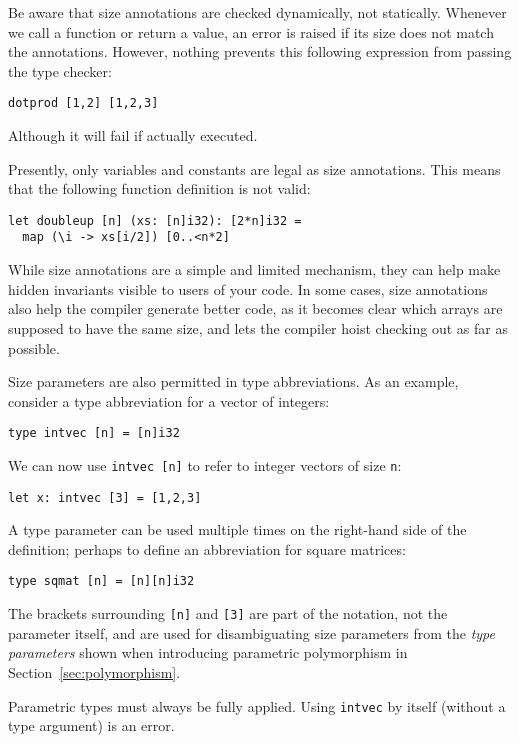 \documentclass[oneside,11pt]{book}
\begin{document}
Be aware that size annotations are checked dynamically, not
statically.  Whenever we call a function or return a value, an error
is raised if its size does not match the annotations.  However,
nothing prevents this following expression from passing the type
checker:
\begin{lstlisting}
dotprod [1,2] [1,2,3]
\end{lstlisting}
Although it will fail if actually executed.

Presently, only variables and constants are legal as size annotations.
This means that the following function definition is not valid:
\begin{lstlisting}
let doubleup [n] (xs: [n]i32): [2*n]i32 =
  map (\i -> xs[i/2]) [0..<n*2]
\end{lstlisting}
While size annotations are a simple and limited mechanism, they can
help make hidden invariants visible to users of your code.  In some
cases, size annotations also help the compiler generate better code,
as it becomes clear which arrays are supposed to have the same size,
and lets the compiler hoist checking out as far as possible.

Size parameters are also permitted in type abbreviations.  As an
example, consider a type abbreviation for a vector of integers:

\begin{lstlisting}
type intvec [n] = [n]i32
\end{lstlisting}

We can now use \lstinline{intvec [n]} to refer to integer vectors of
size \lstinline{n}:

\begin{lstlisting}
let x: intvec [3] = [1,2,3]
\end{lstlisting}

A type parameter can be used multiple times on the right-hand side of
the definition; perhaps to define an abbreviation for square matrices:

\begin{lstlisting}
type sqmat [n] = [n][n]i32
\end{lstlisting}

The brackets surrounding \lstinline{[n]} and \lstinline{[3]} are part
of the notation, not the parameter itself, and are used for
disambiguating size parameters from the \textit{type parameters} shown
when introducing parametric polymorphism in
Section~\ref{sec:polymorphism}.

Parametric types must always be fully applied.  Using
\lstinline{intvec} by itself (without a type argument) is an error.
\end{document}
